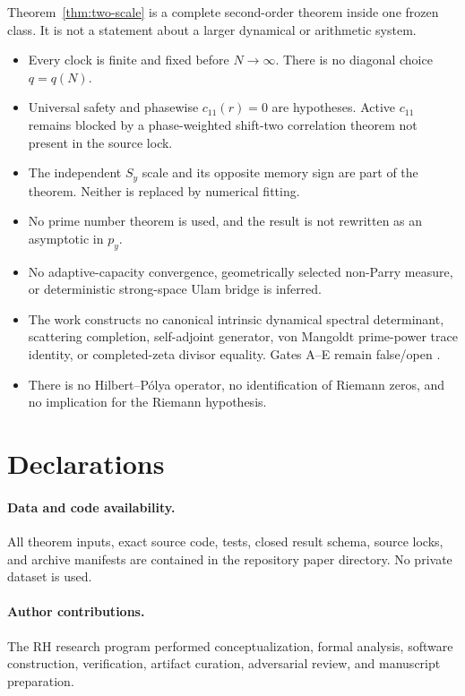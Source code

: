 \documentclass[11pt]{article}
\theoremstyle{definition}
\theoremstyle{remark}
\begin{document}
Theorem~\ref{thm:two-scale} is a complete second-order theorem inside one
frozen class.  It is not a statement about a larger dynamical or arithmetic
system.

\begin{itemize}[leftmargin=2em]
\item Every clock is finite and fixed before $N\to\infty$.  There is no
      diagonal choice $q=q(N)$.
\item Universal safety and phasewise $c_{11}(r)=0$ are hypotheses.  Active
      $c_{11}$ remains blocked by a phase-weighted shift-two correlation
      theorem not present in the source lock.
\item The independent $S_y$ scale and its opposite memory sign are part of
      the theorem.  Neither is replaced by numerical fitting.
\item No prime number theorem is used, and the result is not rewritten as an
      asymptotic in $p_y$.
\item No adaptive-capacity convergence, geometrically selected non-Parry
      measure, or deterministic strong-space Ulam bridge is inferred.
\item The work constructs no canonical intrinsic dynamical spectral
      determinant, scattering completion, self-adjoint generator,
      von Mangoldt prime-power trace identity, or completed-zeta divisor
      equality.  Gates A--E remain false/open \cite{RHMVP2}.
\item There is no Hilbert--P\'olya operator, no identification of Riemann
      zeros, and no implication for the Riemann hypothesis.
\end{itemize}

\section*{Declarations}

\paragraph{Data and code availability.}
All theorem inputs, exact source code, tests, closed result schema, source
locks, and archive manifests are contained in the repository paper
directory.  No private dataset is used.

\paragraph{Author contributions.}
The RH research program performed conceptualization, formal analysis,
software construction, verification, artifact curation, adversarial review,
and manuscript preparation.
\end{document}
